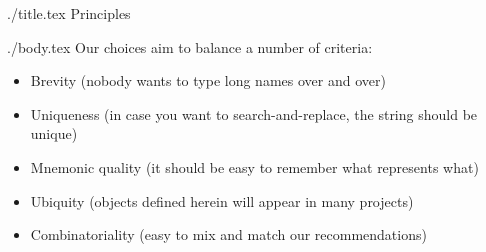 \documentclass{econtex}
\begin{document}
\begin{verbatimwrite}{./title.tex}
Principles
\end{verbatimwrite}

\title{}

\date{\today}
\maketitle 

\begin{verbatimwrite}{./body.tex}
Our choices aim to balance a number of criteria:

\begin{itemize}
\item Brevity (nobody wants to type long names over and over)
\item Uniqueness (in case you want to search-and-replace, the string should be unique)
\item Mnemonic quality (it should be easy to remember what represents what)
\item Ubiquity (objects defined herein will appear in many projects)
\item Combinatoriality (easy to mix and match our recommendations)
\end{itemize}

\end{verbatimwrite}

\end{document}
